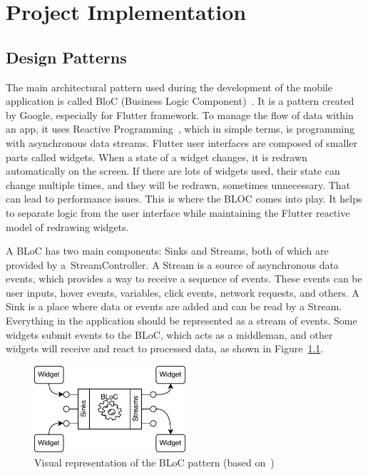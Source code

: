 \chapter{Project Implementation}
\section{Design Patterns}
\label{section:bloc-pattern}
The main architectural pattern used during the development of the mobile application is called BloC (Business Logic Component)~\cite{bloc-pattern}. It is a pattern created by Google, especially for Flutter framework. To manage the flow of data within an app, it uses Reactive Programming~\cite{reactive-programming}, which in simple terms, is programming with asynchronous data streams. Flutter user interfaces are composed of smaller parts called widgets. When a state of a widget changes, it is redrawn automatically on the screen. If there are lots of widgets used, their state can change multiple times, and they will be redrawn, sometimes unnecessary. That can lead to performance issues. This is where the BLOC comes into play. It helps to separate logic from the user interface while maintaining the Flutter reactive model of redrawing widgets.

A BLoC has two main components: Sinks and Streams, both of which are provided by a~StreamController. A Stream is a source of asynchronous data events, which provides a way to receive a sequence of events. These events can be user inputs, hover events, variables, click events, network requests, and others. A Sink is a place where data or events are added and can be read by a Stream. Everything in the application should be represented as a stream of events. Some widgets submit events to the BLoC, which acts as a middleman, and other widgets will receive and react to processed data, as shown in Figure~\ref{fig:bloc-pattern}.

\begin{figure}[htb]
    \centering
    \includegraphics[width=0.5\textwidth]{fig04/bloc_pattern.pdf}
    \caption{Visual representation of the BLoC pattern (based on~\cite{bloc-image})} \label{fig:bloc-pattern}
\end{figure}

